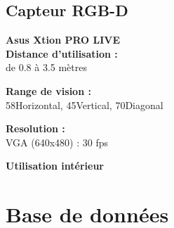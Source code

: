 \subsection{Capteur RGB-D}

{
  \raggedleft
}

\textbf{Asus Xtion PRO LIVE} \\
\textbf{Distance d'utilisation : }\\
de 0.8 à 3.5 mètres

\textbf{Range de vision : } \\
58\degree Horizontal, 45\degree Vertical, 70\degree Diagonal

\textbf{Resolution : } \\
VGA (640x480) : 30 fps

\textbf{Utilisation intérieur}


\section{Base de données }

\begin{figure}[H]
\end{figure}

\begin{figure}[H]
\end{figure}


